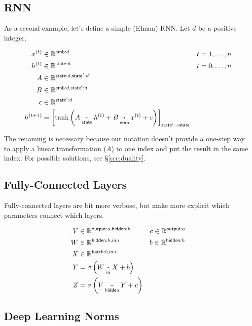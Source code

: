 \documentclass{article}
\newcommand{\name}[1]{\mathsf{#1}}
\newcommand{\ndot}[1]{\mathbin{\mathop{\thinspace\boldsymbol\cdot\thinspace}\limits_{\name{#1}}}}
\newcommand{\reals}{\mathbb{R}}
\begin{document}
\subsection{RNN}
\label{sec:rnn}

As a second example, let's define a simple (Elman) RNN. Let $d$ be a positive integer.

\begin{align*}
x^{(t)} &\in \mathbb{R}^{\name{emb}: d} & t &= 1, \ldots, n \\
h^{(t)} &\in \mathbb{R}^{\name{state}: d} & t &= 0, \ldots, n\\
A &\in \mathbb{R}^{\name{state}: d, \name{state'}: d} \\
B &\in \mathbb{R}^{\name{emb}: d, \name{state'}: d} \\
c &\in \mathbb{R}^{\name{state'}: d} \\
h^{(t+1)} &= \left[ \tanh\left( A \ndot{state} h^{(t)} + B \ndot{emb} x^{(t)} + c \right) \right]_{\name{state'} \rightarrow \name{state}}
\end{align*}

The renaming is necessary because our notation doesn't provide a one-step way to apply a linear transformation ($A$) to one index and put the result in the same index. For possible solutions, see \S\ref{sec:duality}.

\subsection{Fully-Connected Layers}

Fully-connected layers are bit more verbose, but make more explicit which parameters connect which layers.

\begin{align*} 
V &\in \reals^{\name{output}:o, \name{hidden}:h} & c\in \reals^{\name{output}:o} \\
W &\in \reals^{{\name{hidden}:h, \name{in}:i}} & b \in \reals^{\name{hidden}:h} \\
X &\in \reals^{{\name{batch}:b, \name{in}:i}} \\
Y &= \sigma \left( W \ndot{in} X + b \right) \\
Z &= \sigma \left( V \ndot{hidden} Y + c \right)  
\end{align*}

\subsection{Deep Learning Norms}
\end{document}
